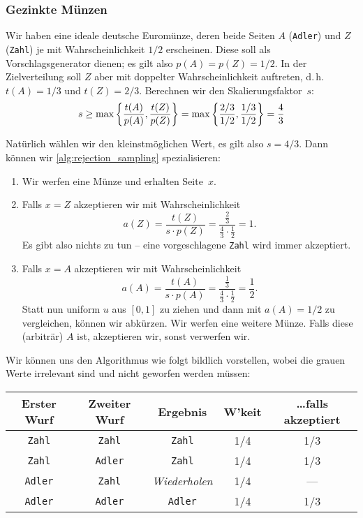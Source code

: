 \subsubsection{Gezinkte Münzen}
Wir haben eine ideale deutsche Euromünze, deren beide Seiten $A$ (\texttt{Adler}) und $Z$ (\texttt{Zahl}) je mit Wahrscheinlichkeit $1/2$ erscheinen.
Diese soll als Vorschlagsgenerator dienen; es gilt also $p(A) = p(Z) = 1/2$.
In der Zielverteilung soll $Z$ aber mit doppelter Wahrscheinlichkeit auftreten, d.\,h. $t(A) = 1/3$ und $t(Z) = 2/3$.
Berechnen wir den Skalierungsfaktor~$s$:
\begin{align}
    s \ge \max\left\{ \frac{t(A)}{p(A)}, \frac{t(Z)}{p(Z)} \right\} = \max\left\{ \frac{2/3}{1/2}, \frac{1/3}{1/2} \right\} = \frac{4}{3}
\end{align}

\noindent
Natürlich wählen wir den kleinstmöglichen Wert, es gilt also $s=4/3$. Dann können wir \cref{alg:rejection_sampling} spezialisieren:
\begin{enumerate}
    \item Wir werfen eine Münze und erhalten Seite~$x$.
    \item Falls $x = Z$ akzeptieren wir mit Wahrscheinlichkeit
          $$
              a(Z) = \frac{t(Z)}{s \cdot p(Z)} = \frac{\frac 2 3}{\frac 4 3 \cdot \frac 1 2} = 1.
          $$
          Es gibt also nichts zu tun -- eine vorgeschlagene \texttt{Zahl} wird immer akzeptiert.
    \item Falls $x = A$ akzeptieren wir mit Wahrscheinlichkeit
          $$
              a(A) = \frac{t(A)}{s \cdot p(A)} = \frac{\frac 1 3}{\frac 4 3 \cdot \frac 1 2} = \frac 1 2.
          $$
          Statt nun uniform $u$ aus $[0, 1]$ zu ziehen und dann mit $a(A) = 1/2$ zu vergleichen, können wir abkürzen.
          Wir werfen eine weitere Münze. Falls diese (arbiträr) $A$ ist, akzeptieren wir, sonst verwerfen wir.
\end{enumerate}

Wir können uns den Algorithmus wie folgt bildlich vorstellen, wobei die grauen Werte irrelevant sind und nicht geworfen werden müssen:
\begin{center}
    \begin{tabular}{c|c|c||c|c}
        Erster Wurf    & Zweiter Wurf                         & Ergebnis           & W'keit & \ldots falls akzeptiert \\\hline
        \texttt{Zahl}  & \textcolor{black!50}{\texttt{Zahl}}  & \texttt{Zahl}      & 1/4    & 1/3                     \\
        \texttt{Zahl}  & \textcolor{black!50}{\texttt{Adler}} & \texttt{Zahl}      & 1/4    & 1/3                     \\\hline
        \texttt{Adler} & \texttt{Zahl}                        & \emph{Wiederholen} & 1/4    & ---                     \\\hline
        \texttt{Adler} & \texttt{Adler}                       & \texttt{Adler}     & 1/4    & 1/3
    \end{tabular}
\end{center}

